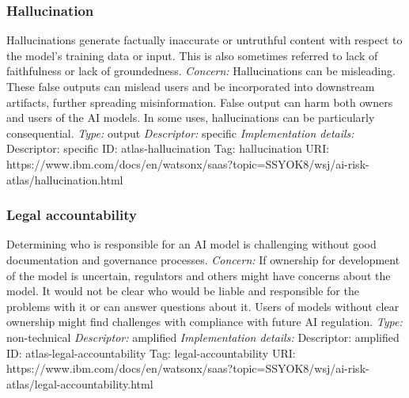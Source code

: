 \documentclass{article}
\begin{document}
\subsubsection*{Hallucination}
Hallucinations generate factually inaccurate or untruthful content with respect to the model's training data or input. This is also sometimes referred to lack of faithfulness or lack of groundedness.\newline
\textit{Concern: }Hallucinations can be misleading. These false outputs can mislead users and be incorporated into downstream artifacts, further spreading misinformation. False output can harm both owners and users of the AI models. In some uses, hallucinations can be particularly consequential.\newline\newline
\textit{Type: }output\newline
\textit{Descriptor: }specific \newline\newline
\textit{Implementation details:} \newline
Descriptor: specific \newline
ID: atlas-hallucination \newline
Tag: hallucination \newline
URI:  https://www.ibm.com/docs/en/watsonx/saas?topic=SSYOK8/wsj/ai-risk-atlas/hallucination.html\newline
\subsubsection*{Legal accountability}
Determining who is responsible for an AI model is challenging without good documentation and governance processes.\newline
\textit{Concern: }If ownership for development of the model is uncertain, regulators and others might have concerns about the model. It would not be clear who would be liable and responsible for the problems with it or can answer questions about it. Users of models without clear ownership might find challenges with compliance with future AI regulation.\newline\newline
\textit{Type: }non-technical\newline
\textit{Descriptor: }amplified \newline\newline
\textit{Implementation details:} \newline
Descriptor: amplified \newline
ID: atlas-legal-accountability \newline
Tag: legal-accountability \newline
URI:  https://www.ibm.com/docs/en/watsonx/saas?topic=SSYOK8/wsj/ai-risk-atlas/legal-accountability.html\newline
\end{document}
